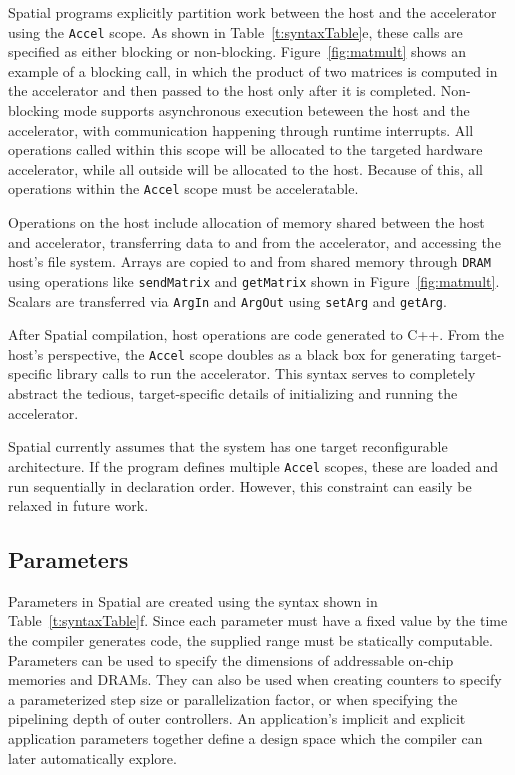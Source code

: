 Spatial programs explicitly partition work between the host and the accelerator using the \texttt{\small{Accel}} scope. As shown in Table~\ref{t:syntaxTable}e, these calls are specified as either blocking or non-blocking. Figure~\ref{fig:matmult} shows an example of a blocking call, in which the product of two
matrices is computed in the accelerator and then passed to the host only after it is completed. Non-blocking mode supports asynchronous execution beteween the host
and the accelerator, with communication happening through runtime interrupts.
All operations called within this scope will be allocated to the targeted hardware accelerator, while all outside will be allocated to the host.
Because of this, all operations within the \texttt{\small{Accel}} scope must be acceleratable.

Operations on the host include allocation of memory shared between the host and accelerator, transferring data to and from the accelerator, and accessing the host's file system.
Arrays are copied to and from shared memory through \texttt{\small{DRAM}} using operations like \texttt{\small{sendMatrix}} and \texttt{\small{getMatrix}} shown in Figure~\ref{fig:matmult}. Scalars are transferred via \texttt{\small{ArgIn}} and \texttt{\small{ArgOut}} using \texttt{\small{setArg}} and \texttt{\small{getArg}}.

After Spatial compilation, host operations are code generated to C++.
From the host's perspective, the \texttt{\small{Accel}} scope doubles as a black box for generating target-specific library calls to run the accelerator.
This syntax serves to completely abstract the tedious, target-specific details of initializing and running the accelerator.

Spatial currently assumes that the system has one target reconfigurable architecture.
If the program defines multiple \texttt{\small{Accel}} scopes, these are loaded and run sequentially in declaration order. However, this constraint can easily be relaxed in future work.



\subsection{Parameters}
Parameters in Spatial are created using the syntax shown in Table~\ref{t:syntaxTable}f.
Since each parameter must have a fixed value by the time the compiler generates code, the supplied range must be statically computable.
Parameters can be used to specify the dimensions of addressable on-chip memories and DRAMs.
They can also be used when creating counters to specify a parameterized step size or parallelization factor, or when specifying the pipelining depth of outer controllers.
An application's implicit and explicit application parameters together define a design space which the compiler can later automatically explore.

